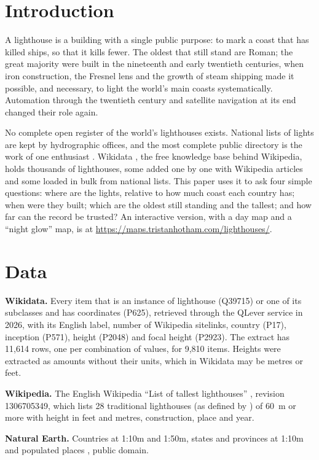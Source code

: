 \documentclass[11pt,a4paper]{article}
\begin{document}
\section{Introduction}
A lighthouse is a building with a single public purpose: to mark a coast that has killed ships, so that it kills fewer. The oldest that still stand are Roman; the great majority were built in the nineteenth and early twentieth centuries, when iron construction, the Fresnel lens and the growth of steam shipping made it possible, and necessary, to light the world's main coasts systematically. Automation through the twentieth century and satellite navigation at its end changed their role again.

No complete open register of the world's lighthouses exists. National lists of lights are kept by hydrographic offices, and the most complete public directory is the work of one enthusiast \citep{rowlett}. Wikidata \citep{wikidata}, the free knowledge base behind Wikipedia, holds thousands of lighthouses, some added one by one with Wikipedia articles and some loaded in bulk from national lists. This paper uses it to ask four simple questions: where are the lights, relative to how much coast each country has; when were they built; which are the oldest still standing and the tallest; and how far can the record be trusted? An interactive version, with a day map and a ``night glow'' map, is at \url{https://maps.tristanhotham.com/lighthouses/}.

\section{Data}
\textbf{Wikidata.} Every item that is an instance of lighthouse (Q39715) or one of its subclasses and has coordinates (P625), retrieved through the QLever service in 2026, with its English label, number of Wikipedia sitelinks, country (P17), inception (P571), height (P2048) and focal height (P2923). The extract has 11,614 rows, one per combination of values, for 9,810 items. Heights were extracted as amounts without their units, which in Wikidata may be metres or feet.

\textbf{Wikipedia.} The English Wikipedia ``List of tallest lighthouses'' \citep{wikitall}, revision 1306705349, which lists 28 traditional lighthouses (as defined by \citealt{rowlett}) of 60~m or more with height in feet and metres, construction, place and year.

\textbf{Natural Earth.} Countries at 1:10m and 1:50m, states and provinces at 1:10m and populated places \citep{naturalearth}, public domain.
\end{document}
